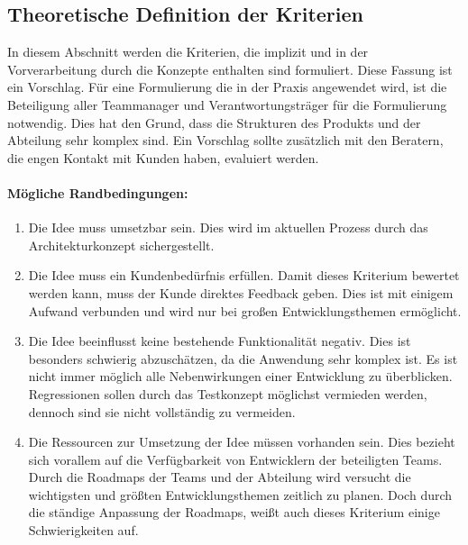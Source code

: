 \subsection{Theoretische Definition der Kriterien}\label{sec:feature-kriterien}
In diesem Abschnitt werden die Kriterien, die implizit und in der Vorverarbeitung durch die Konzepte enthalten sind formuliert. 
Diese Fassung ist ein Vorschlag. Für eine Formulierung die in der Praxis angewendet wird, ist die Beteiligung aller Teammanager und Verantwortungsträger
für die Formulierung notwendig. Dies hat den Grund, dass die Strukturen des Produkts und der Abteilung sehr komplex sind. 
Ein Vorschlag sollte zusätzlich mit den Beratern, die engen Kontakt mit Kunden haben, evaluiert werden. 

\paragraph{Mögliche Randbedingungen:} 
\begin{enumerate}
    \item Die Idee muss umsetzbar sein. Dies wird im aktuellen Prozess durch das Architekturkonzept sichergestellt.
    \item Die Idee muss ein Kundenbedürfnis erfüllen. Damit dieses Kriterium bewertet werden kann, muss der Kunde direktes Feedback geben. Dies ist 
    mit einigem Aufwand verbunden und wird nur bei großen Entwicklungsthemen ermöglicht.
    \item Die Idee beeinflusst keine bestehende Funktionalität negativ. Dies ist besonders schwierig abzuschätzen, da die Anwendung sehr komplex ist. Es ist 
    nicht immer möglich alle Nebenwirkungen einer Entwicklung zu überblicken. Regressionen sollen durch das Testkonzept möglichst vermieden werden, dennoch 
    sind sie nicht vollständig zu vermeiden.
    \item Die Ressourcen zur Umsetzung der Idee müssen vorhanden sein. Dies bezieht sich vorallem auf die Verfügbarkeit von Entwicklern der beteiligten Teams. 
    Durch die Roadmaps der Teams und der Abteilung wird versucht die wichtigsten und größten Entwicklungsthemen zeitlich zu planen. Doch durch die ständige Anpassung  
    der Roadmaps, weißt auch dieses Kriterium einige Schwierigkeiten auf. 
\end{enumerate}
